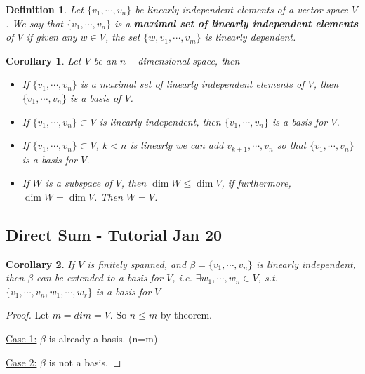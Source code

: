 \documentclass[12pt]{article}
\newtheorem{definition}{Definition}[subsection]
\newtheorem{corollary}{Corollary}[subsection]
\begin{document}
	\begin{definition}
		Let $\{v_1, \cdots, v_n\}$ be linearly independent elements of a vector
		space $V$. We say that $\{v_1, \cdots, v_n\}$ is a \textbf{maximal set
		of linearly independent elements} of $V$ if given any $w \in V$, 
		the set $\{w, v_1, \cdots, v_m\}$ is linearly dependent.\\
	\end{definition}

	\begin{corollary}
		Let $V$ be an $n-$dimensional space, then 
		\begin{itemize}
			\item If $\{v_1, \cdots, v_n\}$ is a maximal set of linearly 
				independent elements of $V$, then $\{v_1, \cdots, v_n\}$ is a 
				basis of $V$. 
			\item 
				If $\{v_1, \cdots, v_n\} \subset V$ is linearly independent, 
				then $\{v_1, \cdots, v_n\}$ is a basis for $V$.
			
			\item
				If $\{v_1, \cdots, v_n\} \subset V$, $k<n$ is linearly
				we can add $v_{k+1}, \cdots, v_n$ so that $\{v_1, \cdots,
				v_n\}$ is a basis for $V$. 
			
			\item 
				If $W$ is a subspace of $V$, then $\dim W\leq \dim V$, 
				if furthermore, $\dim W = \dim V$. Then $W = V$.
		\end{itemize}
	\end{corollary}



	\newpage

	\subsection{Direct Sum - Tutorial Jan 20}
	

	\begin{corollary}
		If $V$ is finitely spanned, and $\beta=\{v_1,\cdots,v_n\}$
		is linearly independent, then $\beta$ can be extended to a basis for 
		$V$, i.e. $\exists w_1, \cdots, w_n \in V$, s.t. 
		$\{v_1,\cdots, v_n, w_1, \cdots, w_r\}$ is a basis for $V$
	\end{corollary}
	\begin{proof}
		Let $m = dim = V$. So $n\leq m$ by theorem.

		\underline{Case 1:} $\beta$ is already a basis. (n=m)

		\underline{Case 2:} $\beta$ is not a basis. 
	\end{proof}
\end{document}
